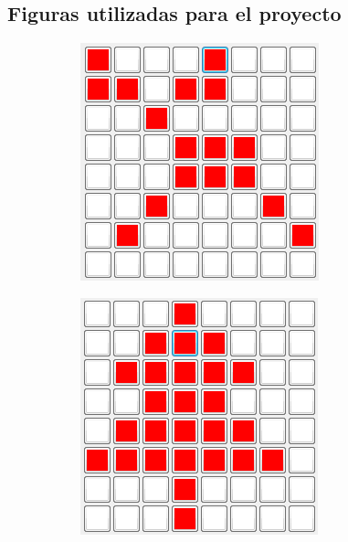 \documentclass[12pt, oneside]{article}
\begin{document}
\subsection{Figuras utilizadas para el proyecto}
\begin{figure}[h!]
    \centering

    \begin{subfigure}{0.45\textwidth}
        \centering
        \includegraphics[width=\linewidth]{figs/reno.PNG}
    \end{subfigure}
    \begin{subfigure}{0.45\textwidth}
        \centering
        \includegraphics[width=\linewidth]{figs/pino.PNG}

\end{subfigure}
\end{figure}
\end{document}
